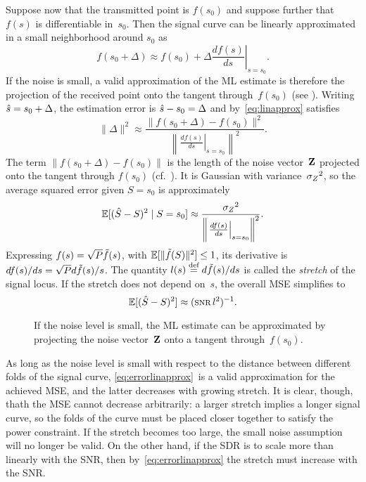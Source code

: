Suppose now that the transmitted point is $f(s_0)$ and suppose further that
$f(s)$ is differentiable in~$s_0$. Then the signal curve can be linearly
approximated in a small neighborhood around $s_0$ as
\begin{equation}
  \label{eq:linapprox}
  f(s_0 + \Delta) \approx f(s_0) + \Delta \left. \frac{df(s)}{ds}\right|_{s =
  s_0}.
\end{equation}
If the noise is small, a valid approximation of the ML estimate is therefore
the projection of the received point onto the tangent through~$f(s_0)$ (see
). Writing ${\hat{s}} = s_0 + \Delta$, the estimation error is
${\hat{s}} - s_0 = \Delta$ and by~\eqref{eq:linapprox} satisfies
\begin{equation*}
  \| \Delta \|^2 \approx \frac{\| f(s_0 + \Delta) - f(s_0) \|^2}
  {\left\| \left. \frac{d f(s)}{ds} \right|_{s = s_0} \right\|^2}.
\end{equation*}
The term $\| f(s_0 + \Delta) - f(s_0) \|$ is the length of the noise
vector~$\mathbf{Z}$ projected onto the tangent through $f(s_0)$
(cf.~). It is Gaussian with variance~${{\sigma_Z}^2}$, so the average
squared error given $S = s_0$ is approximately
\begin{equation}
  \label{eq:errorlinapprox}
  \mathbb{E}[({\hat{S}} - S)^2 \mid S = s_0] \approx \frac{{{\sigma_Z}^2}}{\left\| \left. \frac{df(s)}{ds}
  \right|_{s=s_0} \right\|^2}.
\end{equation}
Expressing $f(s) = \sqrt{P} \tilde{f}(s)$, with $\mathbb{E}[\|\tilde{f}(S)\|^2] \le 1$, its
derivative is
$df(s)/ds = \sqrt{P} d\tilde{f}(s)/s$. The quantity $l(s) \stackrel{\text{def}}{=} d\tilde{f}(s)/ds$ is called
the \emph{stretch} of the signal locus. If the stretch does not depend on~$s$,
the overall MSE simplifies to
\begin{equation}
  \label{eq:constantstretch}
  \mse \approx (\snr l^2)^{-1}.
\end{equation}

\begin{figure}
  \begin{center}
    
  \end{center}
  \caption{If the noise level is small, the ML estimate can be approximated
  by projecting the noise vector~$\mathbf{Z}$ onto a tangent through~$f(s_0)$.}
  \label{fig:tangentproj}
\end{figure}

As long as the noise level is small with respect to the distance between
different folds of the signal curve, \eqref{eq:errorlinapprox}~is a valid
approximation for the achieved MSE, and the latter decreases with growing
stretch. It is clear, though, thath the MSE cannot decrease arbitrarily: a
larger stretch implies a longer signal curve, so the folds of the curve must be
placed closer together to satisfy the power constraint. If the stretch becomes
too large, the small noise assumption will no longer be valid.  On the other
hand, if the SDR is to scale more than linearly with the SNR, then
by~\eqref{eq:errorlinapprox} the stretch must increase with the SNR.

